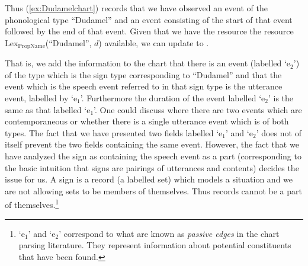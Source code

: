 Thus (\ref{ex:Dudamelchart})
records that we have observed an event of the phonological type
``Dudamel'' and an event consisting of the start of that event
followed by the end of that event.  Given that we have the resource
the resource Lex$_{\mathrm{PropName}}$(``Dudamel'', $d$) available,
 we can update \preveg{} to
\nexteg{}.
\begin{ex} 
\end{ex} 
That is, we add the information to the chart that there is an event
(labelled `e$_2$') of
the type which is the sign type corresponding to ``Dudamel'' and that
the event which is the speech event referred to in that sign type is
the utterance event, labelled by `e$_1$'.  Furthermore the duration of
the event labelled `e$_2$' is the same as that labelled `e$_1$'.  One
could discuss where there are two events which are contemporaneous or whether there is a single utterance event
which is of both types.  The fact that we have presented two fields
labelled `e$_1$' and `e$_2$' does not of itself prevent the two fields
containing the same event.  However, the fact that we have analyzed
the sign as containing the speech event as a part (corresponding to
the basic intuition that signs are pairings of utterances and
contents) decides the issue for us.  A sign is a record (a labelled
set) which models a situation and we are not allowing sets to be members of themselves.  Thus
records cannot be a part of themselves.\footnote{`e$_1$' and `e$_2$'
  correspond to what are known as \textit{passive edges} in the chart
  parsing literature.  They represent information about potential
  constituents that have been found.}   

